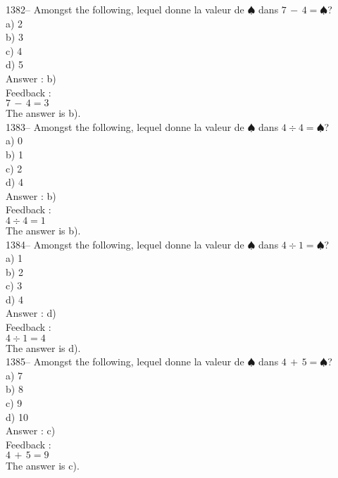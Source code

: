 \documentclass[letterpaper, 12pt]{article}
\begin{document}
1382-- Amongst the following, lequel donne la valeur de
$\spadesuit$ dans $7\,-\,4=\spadesuit$?\\
a) 2\\
b) 3\\
c) 4\\
d) 5\\

Answer : b)\\

Feedback : \\
$7\,-\,4=3$\\
The answer is b).\\

1383-- Amongst the following, lequel donne la valeur de
$\spadesuit$ dans $4\div4=\spadesuit$?\\
a) 0\\
b) 1\\
c) 2\\
d) 4\\

Answer : b)\\

Feedback : \\
$4\div4=1$\\
The answer is b).\\

1384-- Amongst the following, lequel donne la valeur de
$\spadesuit$ dans $4\div1=\spadesuit$?\\
a) 1\\
b) 2\\
c) 3\\
d) 4\\

Answer : d)\\

Feedback : \\
$4\div1=4$\\
The answer is d).\\

1385-- Amongst the following, lequel donne la valeur de
$\spadesuit$ dans $4\,+\,5=\spadesuit$?\\
a) 7\\
b) 8\\
c) 9\\
d) 10\\

Answer : c)\\

Feedback : \\
$4\,+\,5=9$\\
The answer is c).\\
\end{document}
